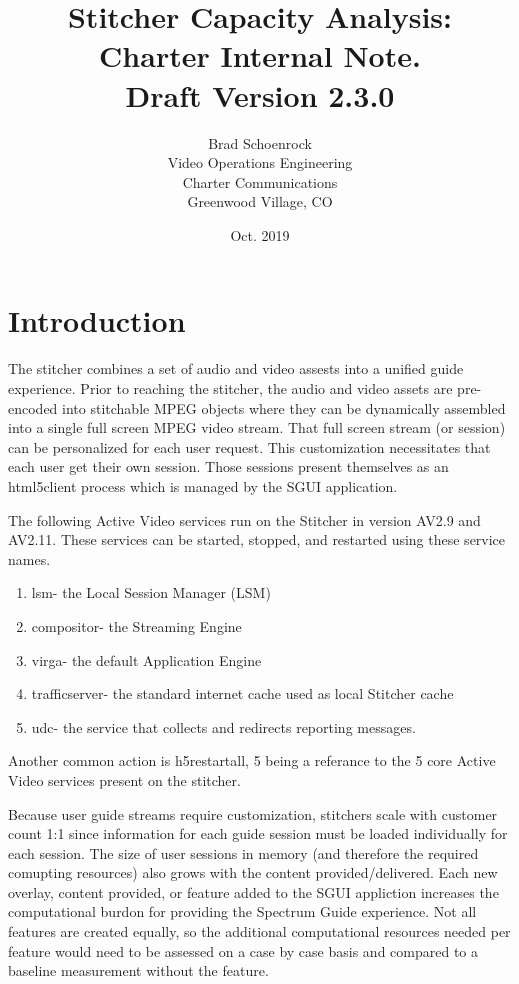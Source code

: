 \documentclass{article}
\author{Brad Schoenrock\\Video Operations Engineering\\Charter Communications\\Greenwood Village, CO}
\title{Stitcher Capacity Analysis:\\Charter Internal Note.\\Draft Version 2.3.0}
\date{Oct. 2019}
\begin{document}
\maketitle
\newpage

\tableofcontents
\newpage

\section{Introduction}
\label{SECTION-Introduction}

The stitcher combines a set of audio and video assests into a unified guide experience. Prior to reaching the stitcher, the audio and video assets are pre-encoded into stitchable MPEG objects where they can be dynamically assembled into a single full screen MPEG video stream. That full screen stream (or session) can be personalized for each user request. This customization necessitates that each user get their own session. Those sessions present themselves as an html5client process which is managed by the SGUI application. 

The following Active Video services run on the Stitcher in version AV2.9 and AV2.11. These services can be started, stopped, and restarted using these service names. 

\begin{enumerate}
\item lsm- the Local Session Manager (LSM)
\item compositor- the Streaming Engine
\item virga- the default Application Engine
\item trafficserver- the standard internet cache used as local Stitcher cache
\item udc- the service that collects and redirects reporting messages.
\end{enumerate}

Another common action is h5restartall, 5 being a referance to the 5 core Active Video services present on the stitcher.

Because user guide streams require customization, stitchers scale with customer count 1:1 since information for each guide session must be loaded individually for each session. The size of user sessions in memory (and therefore the required comupting resources) also grows with the content provided/delivered. Each new overlay, content provided, or feature added to the SGUI appliction increases the computational burdon for providing the Spectrum Guide experience. Not all features are created equally, so the additional computational resources needed per feature would need to be assessed on a case by case basis and compared to a baseline measurement without the feature. 
\end{document}
